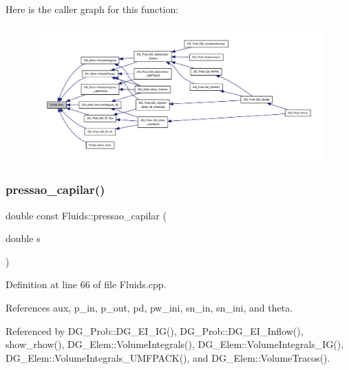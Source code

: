 Here is the caller graph for this function\+:
\nopagebreak
\begin{figure}[H]
\begin{center}
\leavevmode
\includegraphics[width=350pt]{classFluids_abaa29b5611ffefe8f2171692ffd62d38_icgraph}
\end{center}
\end{figure}
\mbox{\label{classFluids_a26c1a1fba1aa34becddfbc4fb07692dd}} 
\subsubsection{\texorpdfstring{pressao\+\_\+capilar()}{pressao\_capilar()}}
{\footnotesize\ttfamily double const Fluids\+::pressao\+\_\+capilar (\begin{DoxyParamCaption}\item[{double}]{s }\end{DoxyParamCaption})}



Definition at line 66 of file Fluids.\+cpp.



References aux, p\+\_\+in, p\+\_\+out, pd, pw\+\_\+ini, sn\+\_\+in, sn\+\_\+ini, and theta.



Referenced by D\+G\+\_\+\+Prob\+::\+D\+G\+\_\+\+E\+I\+\_\+\+I\+G(), D\+G\+\_\+\+Prob\+::\+D\+G\+\_\+\+E\+I\+\_\+\+Inflow(), show\+\_\+rhow(), D\+G\+\_\+\+Elem\+::\+Volume\+Integrals(), D\+G\+\_\+\+Elem\+::\+Volume\+Integrals\+\_\+\+I\+G(), D\+G\+\_\+\+Elem\+::\+Volume\+Integrals\+\_\+\+U\+M\+F\+P\+A\+C\+K(), and D\+G\+\_\+\+Elem\+::\+Volume\+Tracos().


